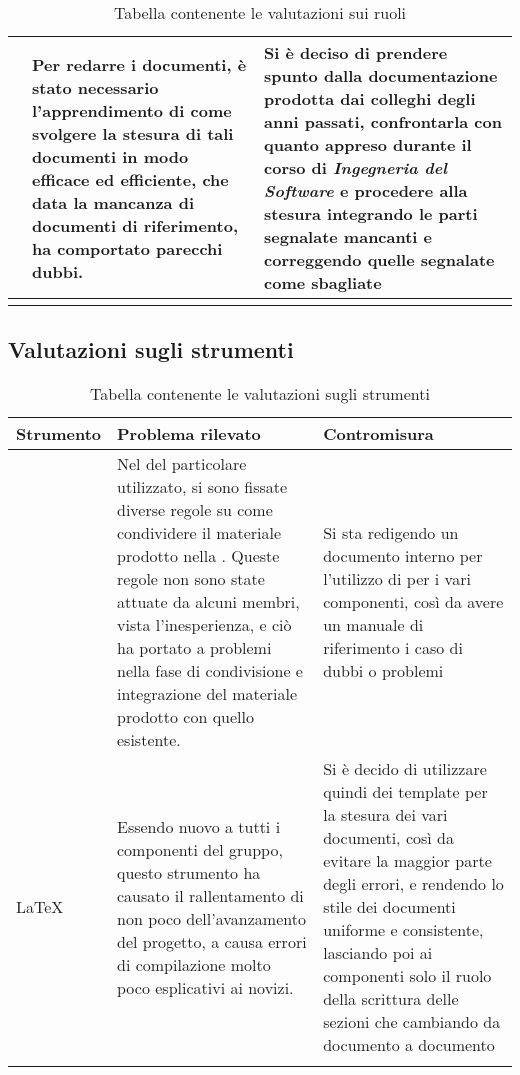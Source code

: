 \begin{center}
\begin{longtable}{|p{3cm}|p{6cm}|p{6cm}|}
			\glock{Amministratore}
	 		&
			Per redarre i documenti, è stato necessario l'apprendimento di come svolgere la stesura di tali documenti in modo efficace ed efficiente, che data la mancanza di documenti di riferimento, ha comportato parecchi dubbi.
	 		&
			Si è deciso di prendere spunto dalla documentazione prodotta dai colleghi degli anni passati, confrontarla con quanto appreso durante il corso di \textit{Ingegneria del Software} e procedere alla stesura integrando le parti segnalate mancanti e correggendo quelle segnalate come sbagliate \\
			\hline
			\rowcolor{white}
			\caption{Tabella contenente le valutazioni sui ruoli}
			\end{longtable}
		\end{center}


	\subsection{Valutazioni sugli strumenti}

		\begin{center}
			\begin{longtable}{|p{3cm}|p{6cm}|p{6cm}|}
			\hline
			\rowcolor{lighter-grayer}
			\textbf{Strumento} & \textbf{Problema rilevato} & \textbf{Contromisura}\\
			\hline
			\endfirsthead

			\hline
			\glock{Version Control System}
	 		&
			Nel \glock{way of working} del particolare \glock{VCS} utilizzato, si sono fissate diverse regole su come condividere il materiale prodotto nella \glock{repository}. Queste regole non sono state attuate da alcuni membri, vista l'inesperienza, e ciò ha portato a problemi nella fase di condivisione e integrazione del materiale prodotto con quello esistente.
		 	&
			Si sta redigendo un documento interno per l'utilizzo di \glock{Github} per i vari componenti, così da avere un manuale di riferimento i caso di dubbi o problemi  \\
			\hline
			\LaTeX
	 		&
			Essendo nuovo a tutti i componenti del gruppo, questo strumento ha causato il rallentamento di non poco dell'avanzamento del progetto, a causa errori di compilazione molto poco esplicativi ai novizi.
	 		&
			Si è decido di utilizzare quindi dei template per la stesura dei vari documenti, così da evitare la maggior parte degli errori, e rendendo lo stile dei documenti uniforme e consistente, lasciando poi ai componenti solo il ruolo della scrittura delle sezioni che cambiando da documento a documento \\
			\hline
			\rowcolor{white}
			\caption{Tabella contenente le valutazioni sugli strumenti}
			\end{longtable}
		\end{center}

